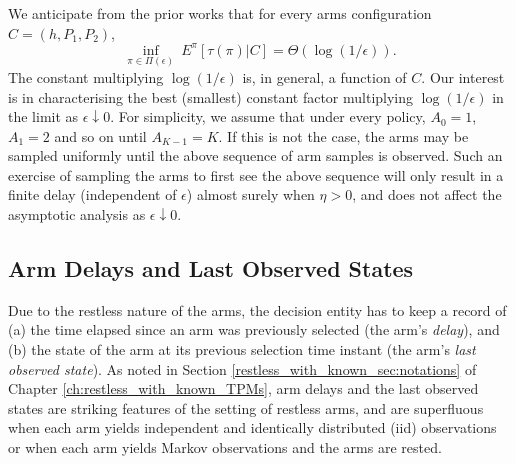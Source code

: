 We anticipate from the prior works that for every arms configuration $C=(h, P_1, P_2)$,
\begin{equation}
	\inf\limits_{\pi\in \Pi(\epsilon)}~E^\pi[\tau(\pi)|C] = \Theta(\log (1/\epsilon)).
	\label{eq:objective}
\end{equation}
The constant multiplying $\log(1/\epsilon)$ is, in general, a function of $C$. Our interest is in characterising the best (smallest) constant factor multiplying $\log(1/\epsilon)$ in the limit as $\epsilon\downarrow 0$. For simplicity, we assume that under every policy, $A_0=1$, $A_1=2$ and so on until $A_{K-1}=K$. If this is not the case, the arms may be sampled uniformly until the above sequence of arm samples is observed. Such an exercise of sampling the arms to first see the above sequence will only result in a finite delay (independent of $\epsilon$) almost surely when $\eta>0$, and does not affect the asymptotic analysis as $\epsilon \downarrow 0$.

\subsection{Arm Delays and Last Observed States}
Due to the restless nature of the arms, the decision entity has to keep a record of (a) the time elapsed since an arm was previously selected (the arm's \emph{delay}), and (b) the state of the arm at its previous selection time instant (the arm's \emph{last observed state}). As noted in Section \ref{restless_with_known_sec:notations} of Chapter \ref{ch:restless_with_known_TPMs}, arm delays and the last observed states are striking features of the setting of restless arms, and are superfluous when each arm yields independent and identically distributed (iid) observations or when each arm yields Markov observations and the arms are rested.

